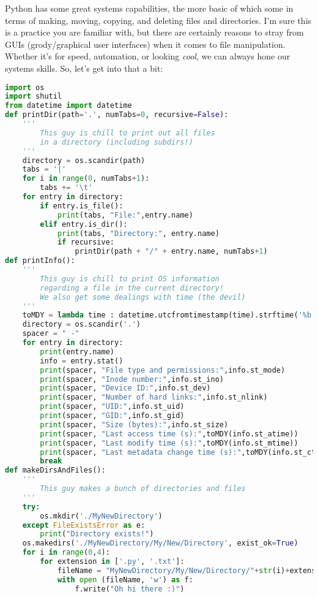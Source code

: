 \documentclass[12pt, twoside, reqno]{book}
\begin{document}
Python has some great systems capabilities, the more basic of which some in terms of making, moving, copying, and deleting files and directories. I'm sure this is a practice you are familiar with, but there are certainly reasons to stray from GUIs (grody/graphical user interfaces) when it comes to file manipulation. Whether it's for speed, automation, or looking \textit{cool}, we can always hone our systems skills. So, let's get into that a bit:
\begin{lstlisting}[language=Python]
import os
import shutil
from datetime import datetime
def printDir(path='.', numTabs=0, recursive=False):
    '''
        This guy is chill to print out all files
        in a directory (including subdirs!)
    '''
    directory = os.scandir(path)
    tabs = '|'
    for i in range(0, numTabs+1):
        tabs += '\t' 
    for entry in directory:
        if entry.is_file():
            print(tabs, "File:",entry.name)
        elif entry.is_dir():
            print(tabs, "Directory:", entry.name)
            if recursive:
                printDir(path + "/" + entry.name, numTabs+1)
def printInfo():
    '''
        This guy is chill to print OS information
        regarding a file in the current directory!
        We also get some dealings with time (the devil)
    '''
    toMDY = lambda time : datetime.utcfromtimestamp(time).strftime('%b %d, %Y - %H:%M:%S')
    directory = os.scandir('.')
    spacer = " -"
    for entry in directory:
        print(entry.name)
        info = entry.stat()
        print(spacer, "File type and permissions:",info.st_mode)
        print(spacer, "Inode number:",info.st_ino)
        print(spacer, "Device ID:",info.st_dev)
        print(spacer, "Number of hard links:",info.st_nlink)
        print(spacer, "UID:",info.st_uid)
        print(spacer, "GID:",info.st_gid)
        print(spacer, "Size (bytes):",info.st_size)
        print(spacer, "Last access time (s):",toMDY(info.st_atime))
        print(spacer, "Last modify time (s):",toMDY(info.st_mtime))
        print(spacer, "Last metadata change time (s):",toMDY(info.st_ctime))
        break
def makeDirsAndFiles():
    '''
        This guy makes a bunch of directories and files
    '''
    try:
        os.mkdir('./MyNewDirectory')
    except FileExistsError as e:
        print("Directory exists!")
    os.makedirs('./MyNewDirectory/My/New/Directory', exist_ok=True)
    for i in range(0,4):
        for extension in ['.py', '.txt']:
            fileName = "MyNewDirectory/My/New/Directory/"+str(i)+extension
            with open (fileName, 'w') as f:
                f.write("Oh hi there :)")

\end{lstlisting}
\end{document}
